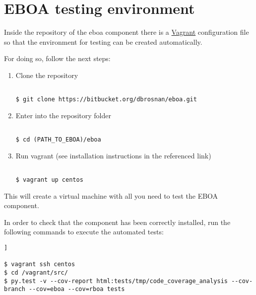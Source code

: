\chapter{EBOA testing environment}\label{c:install_eboa}

Inside the repository of the \acrshort{eboa} component there is a \href{https://www.vagrantup.com/}{Vagrant} configuration file so that the environment for testing can be created automatically.

For doing so, follow the next steps:

\begin{enumerate}

\item Clone the repository

\begin{lstlisting}[breaklines=true, style=bash]

$ git clone https://bitbucket.org/dbrosnan/eboa.git

\end{lstlisting}

\item Enter into the repository folder

\begin{lstlisting}[breaklines=true, style=bash]

$ cd (PATH_TO_EBOA)/eboa

\end{lstlisting}

\item Run vagrant (see installation instructions in the referenced link)

\begin{lstlisting}[breaklines=true, style=bash]

$ vagrant up centos

\end{lstlisting}

\end{enumerate}

This will create a virtual machine with all you need to test the EBOA component.

In order to check that the component has been correctly installed, run the following commands to execute the automated tests:

\begin{lstlisting}[breaklines=true, style=bash]]

$ vagrant ssh centos
$ cd /vagrant/src/
$ py.test -v --cov-report html:tests/tmp/code_coverage_analysis --cov-branch --cov=eboa --cov=rboa tests

\end{lstlisting}

